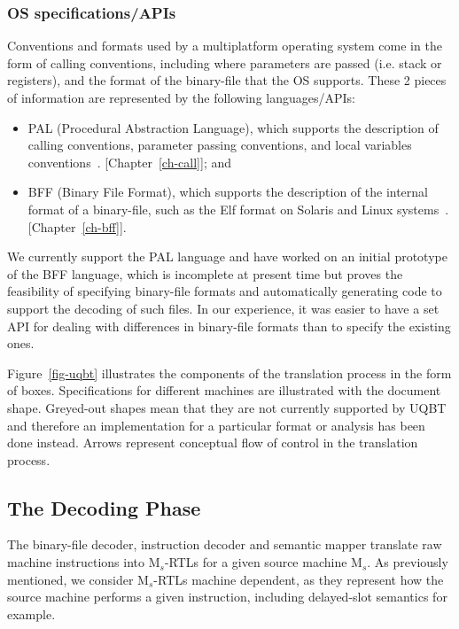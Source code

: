 \subsubsection*{OS specifications/APIs} 
Conventions and formats used by a multiplatform operating system come 
in the form of calling conventions, including where parameters are passed 
(i.e. stack or registers), and the format of the binary-file that the 
OS supports.  
These 2 pieces of information are represented by the following 
languages/APIs: 

  \begin{itemize}
  \item PAL (Procedural Abstraction Language), which supports 
	the description of calling conventions, parameter passing conventions, 
	and local variables conventions~\cite{Cifu99g}. [Chapter~\ref{ch-call}];  
	and 

  \item BFF (Binary File Format), which supports the description 
	of the internal format of a binary-file, such as the 
	Elf format on Solaris and Linux systems~\cite{Cifu97f}. 
	[Chapter~\ref{ch-bff}].  
  \end{itemize} 

We currently support the PAL language and have worked on 
an initial prototype of the BFF language, which is incomplete 
at present time but proves the feasibility of specifying 
binary-file formats and automatically generating code to 
support the decoding of such files.  In our experience, it 
was easier to have a set API for dealing with differences in 
binary-file formats than to specify the existing ones.   


Figure~\ref{fig-uqbt} illustrates the components of the 
translation process in the form of boxes.  Specifications for different
machines are illustrated with the document shape.
Greyed-out shapes mean that they are not currently supported 
by UQBT and therefore an implementation for a particular format 
or analysis has been done instead.  Arrows represent conceptual 
flow of control in the translation process.  


\subsection{The Decoding Phase}
The binary-file decoder, instruction decoder 
and semantic mapper translate raw machine instructions into  
M$_s$-RTLs for a given source machine M$_s$.  
As previously mentioned, we consider M$_s$-RTLs machine dependent, as
they represent how the source machine performs a given instruction, 
including delayed-slot semantics for example.  

